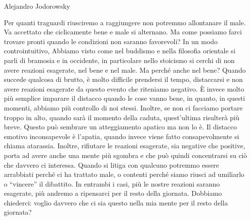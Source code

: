 \documentclass[12pt]{book} %
\begin{document}
Alejandro Jodorowsky


\bigskip


\bigskip


\bigskip


\bigskip

Per quanti traguardi riusciremo a raggiungere non potremmo allontanare il male. Va accettato che ciclicamente bene e
male si alternano. Ma come possiamo farci trovare pronti quando le condizioni non saranno favorevoli? In un modo
controintuitivo, Abbiamo visto come nel buddismo e nella filosofia orientale si parli di bramosia e in occidente, in
particolare nello stoicismo si cerchi di non avere reazioni esagerate, nel bene e nel male. Ma perché anche nel bene?
Quando succede qualcosa di brutto, è molto difficile prendersi il tempo, distaccarsi e non avere reazioni esagerate da
questo evento che riteniamo negativo. È invece molto più semplice imparare il distacco quando le cose vanno bene, in
quanto, in questi momenti, abbiamo più controllo di noi stessi. Inoltre, se non ci facciamo portare troppo in alto,
quando sarà il momento della caduta, quest'ultima risulterà più breve. Questo può sembrare un
atteggiamento apatico ma non lo è. Il distacco emotivo inconsapevole è l'apatia, quando invece viene fatto
consapevolmente si chiama atarassia. Inoltre, rifiutare le reazioni esagerate, sia negative che positive, porta ad
avere anche una mente più sgombra e che può quindi concentrarsi su ciò che davvero ci interessa. Quando si litiga con
qualcuno potremmo essere arrabbiati perché ci ha trattato male, o contenti perché siamo riusci ad umiliarlo o “vincere”
il dibattito. In entrambi i casi, più le nostre reazioni saranno esagerate, più andremo a ripensarci per il resto della
giornata. Dobbiamo chiederci: voglio davvero che ci sia questo nella mia mente per il resto della giornata?
\end{document}
